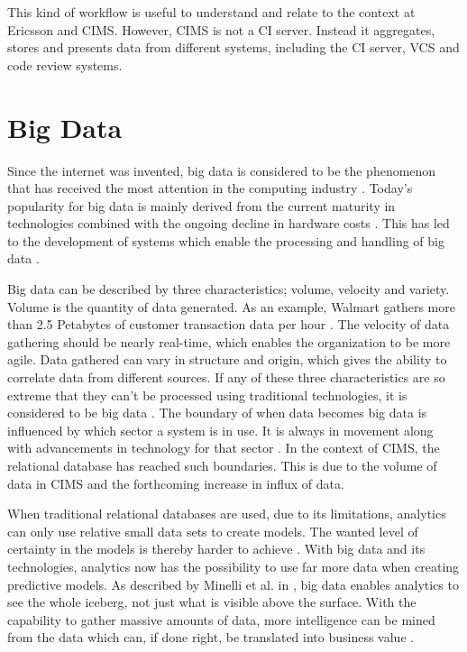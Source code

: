 This kind of workflow is useful to understand and relate to the context at Ericsson and CIMS. However, CIMS is not a CI server. Instead it aggregates, stores and presents data from different systems, including the CI server, VCS and code review systems.

\section{Big Data}
Since the internet was invented, big data is considered to be the phenomenon that has received the most attention in the computing industry \cite{bigDataWarehouse}. Today's popularity for big data is mainly derived from the current maturity in technologies combined with the ongoing decline in hardware costs \cite{bigDataWarehouse, bigDatabigAn}. This has led to the development of systems which enable the processing and handling of big data \cite{bigDataWarehouse}.

Big data can be described by three characteristics; volume, velocity and variety. Volume is the quantity of data generated. As an example, Walmart gathers more than 2.5 Petabytes of customer transaction data per hour \cite{bigDataMane}. The velocity of data gathering should be nearly real-time, which enables the organization to be more agile. Data gathered can vary in structure and origin, which gives the ability to correlate data from different sources. If any of these three characteristics are so extreme that they can't be processed using traditional technologies, it is considered to be big data \cite{bigDataWarehouse}. The boundary of when data becomes big data is influenced by which sector a system is in use. It is always in movement along with advancements in technology for that sector \cite{bigDatabigAn}. In the context of CIMS, the relational database has reached such boundaries. This is due to the volume of data in CIMS and the forthcoming increase in influx of data.  

When traditional relational databases are used, due to its limitations, analytics can only use relative small data sets to create models. The wanted level of certainty in the models is thereby harder to achieve \cite{bigDatabigAn}. With big data and its technologies, analytics now has the possibility to use far more data when creating predictive models. As described by Minelli et al. in \cite{bigDatabigAn}, big data enables analytics to see the whole iceberg, not just what is visible above the surface. With the capability to gather massive amounts of data, more intelligence can be mined from the data which can, if done right, be translated into business value \cite{bigDataMane}.

